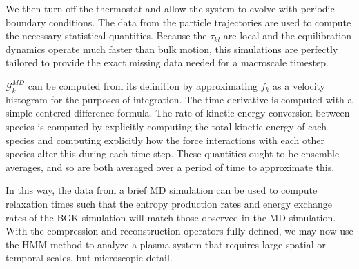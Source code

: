 \documentclass{article}
\begin{document}
We then turn off the thermostat and allow the system to evolve with periodic boundary conditions. The data from the particle trajectories are used to compute the necessary statistical quantities. Because the $\tau_{kl}$ are local and the equilibration dynamics operate much faster than bulk motion, this simulations are perfectly tailored to provide the exact missing data needed for a macroscale timestep.

$\mathcal{G}_k^{MD}$ can be computed from its definition by approximating $f_k$ as a velocity histogram for the purposes of integration. The time derivative is computed with a simple centered difference formula. The rate of kinetic energy conversion between species is computed by explicitly computing the total kinetic energy of each species and computing explicitly how the force interactions with each other species alter this during each time step. These quantities ought to be ensemble averages, and so are both averaged over a period of time to approximate this.

In this way, the data from a brief MD simulation can be used to compute relaxation times such that the entropy production rates and energy exchange rates of the BGK simulation will match those observed in the MD simulation. With the compression and reconstruction operators fully defined, we may now use the HMM method to analyze a plasma system that requires large spatial or temporal scales, but microscopic detail.
\end{document}
